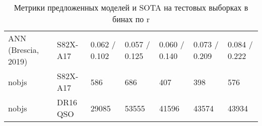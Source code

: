 \begin{table*}
\begin{tabular}{lllllll}
          ANN (Brescia, 2019) &  S82X-A17 &                    0.062 / 0.102 &                    0.057 / 0.125 &                    0.060 / 0.140 &                    0.073 / 0.209 &                    0.084 / 0.222 \\
                        nobjs &  S82X-A17 &                              586 &                              686 &                              407 &                              398 &                              576 \\
                        nobjs &  DR16 QSO &                            29085 &                            53555 &                            41596 &                            43574 &                            43934 \\
    \hline
    \end{tabular}
    
    \caption{Метрики предложенных моделей и SOTA на тестовых выборках в бинах по r}
    \label{tab:metrics-rmag}
\end{table*}


